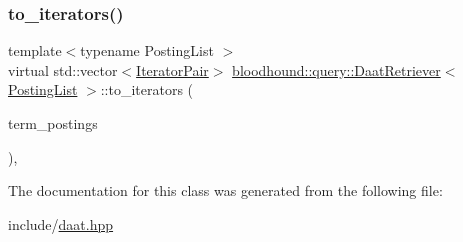 \subsubsection{\texorpdfstring{to\+\_\+iterators()}{to\_iterators()}}
{\footnotesize\ttfamily template$<$typename Posting\+List $>$ \\
virtual std\+::vector$<$\hyperlink{structbloodhound_1_1query_1_1DaatRetriever_1_1IteratorPair}{Iterator\+Pair}$>$ \hyperlink{classbloodhound_1_1query_1_1DaatRetriever}{bloodhound\+::query\+::\+Daat\+Retriever}$<$ \hyperlink{classbloodhound_1_1PostingList}{Posting\+List} $>$\+::to\+\_\+iterators (\begin{DoxyParamCaption}\item[{const std\+::vector$<$ \hyperlink{classbloodhound_1_1PostingList}{Posting\+List} $>$ \&}]{term\+\_\+postings }\end{DoxyParamCaption})\hspace{0.3cm}{\ttfamily [inline]}, {\ttfamily [virtual]}}



The documentation for this class was generated from the following file\+:\begin{DoxyCompactItemize}
\item 
include/\hyperlink{daat_8hpp}{daat.\+hpp}\end{DoxyCompactItemize}
